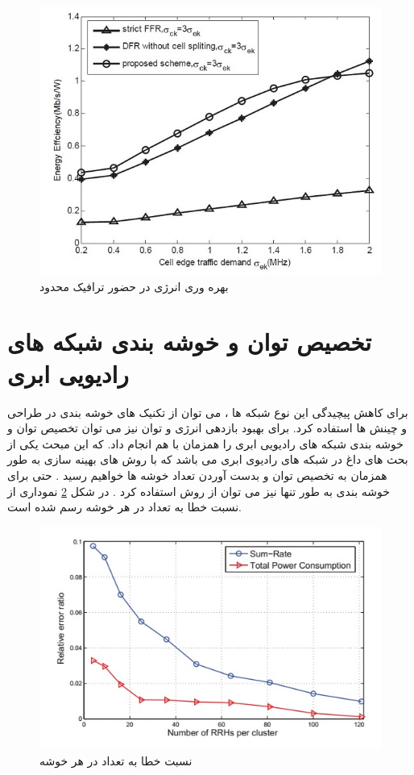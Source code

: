 \begin{figure}
  \centering
    \includegraphics[scale=0.7]{./pic1/8}
  \caption{  بهره وری انرژی در حضور ترافیک محدود \cite{graph} }
  \label{fig:8}
\end{figure}
\section{تخصیص توان و خوشه بندی شبکه های رادیویی ابری}
برای کاهش پیچیدگی این نوع شبکه ها ، می توان از تکنیک های خوشه بندی در طراحی و چینش ها استفاده کرد. برای بهبود بازدهی انرژی و توان نیز می توان تخصیص توان و خوشه بندی شبکه های رادیویی ابری را همزمان با هم انجام داد. 
که این مبحث یکی از بحث های داغ در شبکه های رادیوی ابری می باشد که با روش های بهینه سازی به طور همزمان به تخصیص توان و بدست آوردن تعداد خوشه ها خواهیم رسید .
حتی برای خوشه بندی به طور تنها نیز می توان از روش  استفاده کرد . در شکل \ref{fig:88} نموداری از نسبت خطا به تعداد   در هر خوشه رسم شده است. 
\begin{figure}
  \centering
    \includegraphics[scale=0.7]{./pic1/88}
  \caption{  نسبت خطا به تعداد  در هر خوشه \cite{graph}  }
  \label{fig:88}
\end{figure}
